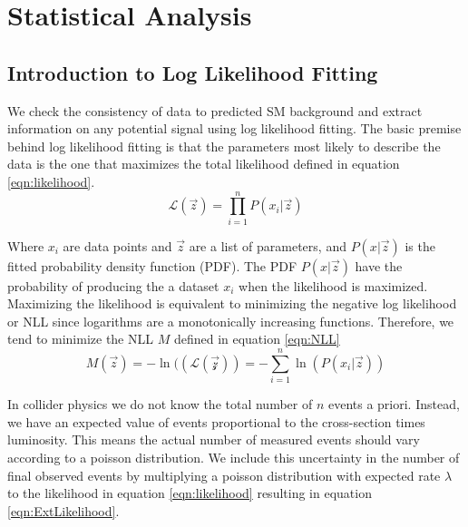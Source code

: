 \chapter{Statistical Analysis}
\label{chap:statistics}

\section{Introduction to Log Likelihood Fitting}
\label{sec:stat:likelihood}

\indent We check the consistency of data to predicted SM background and extract information on any potential signal using log likelihood fitting.  The basic premise behind log likelihood fitting is that the parameters most likely to describe the data is the one that maximizes the total likelihood defined in equation \ref{eqn:likelihood}.  \\

\begin{equation}
\label{eqn:likelihood}
{\mathcal{L}}(\vec{z}) = {\displaystyle\prod_{i=1}^{n}} P(x_i|\vec{z})
\end{equation}

\indent Where $x_i$ are data points and $\vec{z}$ are a list of parameters, and $P(x|\vec{z})$ is the fitted probability density function (PDF).  The PDF $P(x|\vec{z})$ have the probability of producing the a dataset $x_i$ when the likelihood is maximized. \\

\indent Maximizing the likelihood is equivalent to minimizing the negative log likelihood or NLL since logarithms are a monotonically increasing functions.  Therefore, we tend to minimize the NLL $M$ defined in equation \ref{eqn:NLL} \\

\begin{equation}
\label{eqn:NLL}
M(\vec{z})=-\ln(({\mathcal{L(\vec{z})}}) = -{\displaystyle\sum_{i=1}^{n}} \ln( P(x_i|\vec{z}) )
\end{equation}

\indent In collider physics we do not know the total number of $n$ events a priori.  Instead, we have an expected value of events proportional to the cross-section times luminosity.  This means the actual number of measured events should vary according to a poisson distribution.  We include this uncertainty in the number of final observed events by multiplying a poisson distribution with expected rate $\lambda$ to the likelihood in equation \ref{eqn:likelihood} resulting in equation \ref{eqn:ExtLikelihood}.  \\

